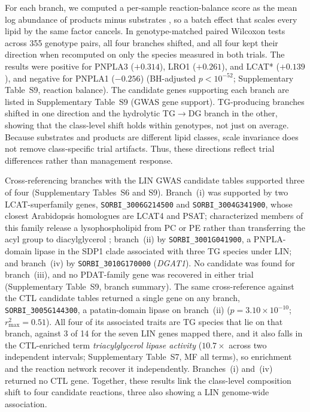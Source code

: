 \documentclass[9pt,twocolumn,twoside]{rilabRxiv}
\begin{document}
For each branch, we computed a per-sample reaction-balance score as the mean log abundance of products minus substrates \citep{Rose2023LINEX2, Gieger2008, Illig2010}, so a batch effect that scales every lipid by the same factor cancels. In genotype-matched paired Wilcoxon tests across 355 genotype pairs, all four branches shifted, and all four kept their direction when recomputed on only the species measured in both trials. The results were positive for PNPLA3 ($+0.314$), LRO1 ($+0.261$), and LCAT* ($+0.139$), and negative for PNPLA1 ($-0.256$) (BH-adjusted $p<10^{-52}$; Supplementary Table~S9, reaction balance). The candidate genes supporting each branch are listed in Supplementary Table~S9 (GWAS gene support). TG-producing branches shifted in one direction and the hydrolytic TG$\rightarrow$DG branch in the other, showing that the class-level shift holds within genotypes, not just on average. Because substrates and products are different lipid classes, scale invariance does not remove class-specific trial artifacts. Thus, these directions reflect trial differences rather than management response.

Cross-referencing branches with the LIN GWAS candidate tables supported three of four (Supplementary Tables~S6 and S9). Branch~(i) was supported by two LCAT-superfamily genes, \texttt{SORBI\_3006G214500} and \texttt{SORBI\_3004G341900}, whose closest Arabidopsis homologues are LCAT4 and PSAT; characterized members of this family release a lysophospholipid from PC or PE rather than transferring the acyl group to diacylglycerol \citep{Chen2012LCATPLA, Banas2005PSAT}; branch~(ii) by \texttt{SORBI\_3001G041900}, a PNPLA-domain lipase in the SDP1 clade associated with three TG species under LIN; and branch~(iv) by \texttt{SORBI\_3010G170000} (\textit{DGAT1}). No candidate was found for branch~(iii), and no PDAT-family gene was recovered in either trial (Supplementary Table~S9, branch summary). The same cross-reference against the CTL candidate tables returned a single gene on any branch, \texttt{SORBI\_3005G144300}, a patatin-domain lipase on branch~(ii) ($p = 3.10\times10^{-10}$; $r^2_{\max}=0.51$). All four of its associated traits are TG species that lie on that branch, against 3 of 14 for the seven LIN genes mapped there, and it also falls in the CTL-enriched term \textit{triacylglycerol lipase activity} ($10.7\times$ across two independent intervals; Supplementary Table~S7, MF all terms), so enrichment and the reaction network recover it independently. Branches~(i) and~(iv) returned no CTL gene. Together, these results link the class-level composition shift to four candidate reactions, three also showing a LIN genome-wide association.
\end{document}
